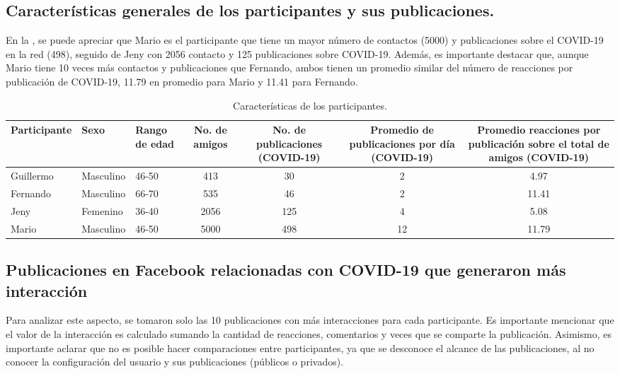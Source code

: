 \documentclass[spanish]{textolivre}
\begin{document}
\subsection{Características generales de los participantes y sus publicaciones.}

En la , se puede apreciar que Mario es el participante que tiene un mayor número de contactos (5000) y publicaciones sobre el COVID-19 en la red (498), seguido de Jeny con 2056 contacto y 125 publicaciones sobre COVID-19. Además, es importante destacar que, aunque Mario tiene 10 veces más contactos y publicaciones que Fernando, ambos tienen un promedio similar del número de reacciones por publicación de COVID-19, 11.79 en promedio para Mario y 11.41 para Fernando. 


%
%
\begin{table}[htpb]
\caption{Características de los participantes.}
\label{tab03}
\small
\centering
\begin{tabular}{lllcccc}
\toprule 
Participante &
Sexo &
\multicolumn{1}{p{1cm}}{\centering Rango de edad} &
\multicolumn{1}{p{1cm}}{\centering No. de amigos} &
\multicolumn{1}{p{1.5cm}}{\centering No. de publicaciones (COVID-19)} &
\multicolumn{1}{p{1.75cm}}{\centering Promedio de publicaciones por día (COVID-19)} &
\multicolumn{1}{p{2cm}}{\centering Promedio reacciones por publicación sobre el total de amigos (COVID-19)} \\
\midrule 
Guillermo & Masculino & 46-50 & 413 & 30 & 2 & 4.97 \\
Fernando & Masculino & 66-70 & 535 & 46 & 2 & 11.41 \\
Jeny & Femenino & 36-40 & 2056 & 125 & 4 & 5.08 \\
Mario & Masculino & 46-50 & 5000 & 498 & 12 & 11.79 \\
\bottomrule
\end{tabular}
\end{table}

\subsection{Publicaciones en Facebook relacionadas con COVID-19 que generaron más interacción}

Para analizar este aspecto, se tomaron solo las 10 publicaciones con más interacciones para cada participante. Es importante mencionar que el valor de la interacción es calculado sumando la cantidad de reacciones, comentarios y veces que se comparte la publicación. Asimismo, es importante aclarar que no es posible hacer comparaciones entre participantes, ya que se desconoce el alcance de las publicaciones, al no conocer la configuración del usuario y sus publicaciones (públicos o privados).
\end{document}
